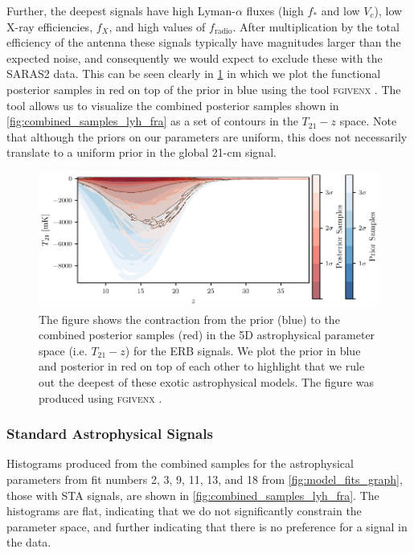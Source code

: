 Further, the deepest signals have high Lyman-$\alpha$ fluxes (high $f_*$ and low $V_c$), low X-ray efficiencies, $f_X$, and high values of $f_\mathrm{radio}$. After multiplication by the total efficiency of the antenna these signals typically have magnitudes larger than the expected noise, and consequently we would expect to exclude these with the SARAS2 data. This can be seen clearly in \cref{fig:fradio_fgivenx} in which we plot the functional posterior samples in red on top of the prior in blue using the tool \textsc{fgivenx} \citep{fgivenx}. The tool allows us to visualize the combined posterior samples shown in \cref{fig:combined_samples_lyh_fra} as a set of contours in the $T_{21} - z$ space. Note that although the priors on our parameters are uniform, this does not necessarily translate to a uniform prior in the global 21-cm signal.

\begin{figure}
    \centering
    \includegraphics{saras2/figs/fgivenx_signals_nlive_500_fradio_only.pdf}
    \caption{The figure shows the contraction from the prior (blue) to the combined posterior samples (red) in the 5D astrophysical parameter space (i.e. $T_{21} - z$) for the ERB signals. We plot the prior in blue and posterior in red on top of each other to highlight that we rule out the deepest of these exotic astrophysical models. The figure was produced using \textsc{fgivenx} \protect\citep{fgivenx}.}
    \label{fig:fradio_fgivenx}
\end{figure}

\subsubsection{Standard Astrophysical Signals}

Histograms produced from the combined samples for the astrophysical parameters from fit numbers 2, 3, 9, 11, 13, and 18 from \cref{fig:model_fits_graph}, those with STA signals, are shown in \cref{fig:combined_samples_lyh_fra}. The histograms are flat, indicating that we do not significantly constrain the parameter space, and further indicating that there is no preference for a signal in the data.

